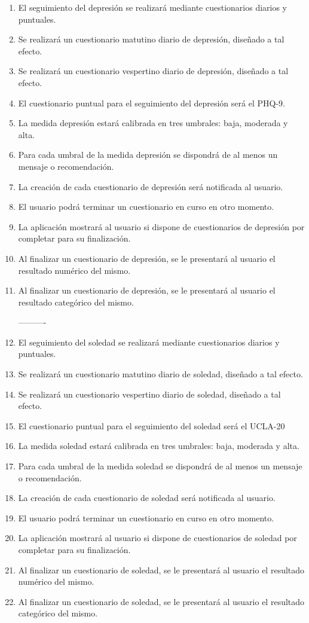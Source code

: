 \begin{enumerate}[label=\textbf{\texttt{RF-\arabic*}}]
            ----------
            \item El seguimiento del depresión se realizará mediante cuestionarios diarios y puntuales.
            \item Se realizará un cuestionario matutino diario de depresión, diseñado a tal efecto.
            \item Se realizará un cuestionario vespertino diario de depresión, diseñado a tal efecto.
            \item El cuestionario puntual para el seguimiento del depresión será el PHQ-9.
            \item La medida depresión estará calibrada en tres umbrales: baja, moderada y alta.
            \item Para cada umbral de la medida depresión se dispondrá de al menos un mensaje o recomendación.
            \item La creación de cada cuestionario de depresión será notificada al usuario.
            \item El usuario podrá terminar un cuestionario en curso en otro momento.
            \item La aplicación mostrará al usuario si dispone de cuestionarios de depresión por completar para su finalización.
            \item Al finalizar un cuestionario de depresión, se le presentará al usuario el resultado numérico del mismo.
            \item Al finalizar un cuestionario de depresión, se le presentará al usuario el resultado categórico del mismo.
            
            ----------
            \item El seguimiento del soledad se realizará mediante cuestionarios diarios y puntuales.
            \item Se realizará un cuestionario matutino diario de soledad, diseñado a tal efecto.
            \item Se realizará un cuestionario vespertino diario de soledad, diseñado a tal efecto.
            \item El cuestionario puntual para el seguimiento del soledad será el UCLA-20
            \item La medida soledad estará calibrada en tres umbrales: baja, moderada y alta.
            \item Para cada umbral de la medida soledad se dispondrá de al menos un mensaje o recomendación.
            \item La creación de cada cuestionario de soledad será notificada al usuario.
            \item El usuario podrá terminar un cuestionario en curso en otro momento.
            \item La aplicación mostrará al usuario si dispone de cuestionarios de soledad por completar para su finalización.
            \item Al finalizar un cuestionario de soledad, se le presentará al usuario el resultado numérico del mismo.
            \item Al finalizar un cuestionario de soledad, se le presentará al usuario el resultado categórico del mismo.
            

\end{enumerate}
